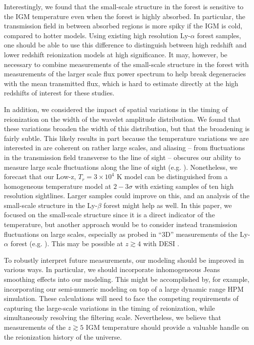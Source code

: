 Interestingly, we found that the small-scale structure in the
forest is sensitive to the IGM temperature even when the forest is highly absorbed. In particular, the transmission
field in between absorbed regions is more spiky if the IGM is cold, compared to hotter models. Using existing
high resolution Ly-$\alpha$ forest samples, one should be able to use this difference to 
distinguish between high redshift and lower
redshift reionization models at high significance. It may, however, be necessary to combine measurements
of the small-scale structure in the forest with measurements of the larger scale flux power spectrum to help
break degeneracies with the mean transmitted flux, which is hard to estimate directly at the high redshifts of
interest for these studies. 

In addition, we considered the impact of spatial variations in the timing of reionization on the width of
the wavelet amplitude distribution. We found that these variations broaden the width of this distribution, but
that the broadening is fairly subtle. This likely results in part because the temperature variations we
are interested in are coherent on rather large scales, and aliasing -- from fluctuations in the transmission
field transverse to the line of sight -- obscures our ability to measure large scale fluctuations along
the line of sight (e.g. \citealt{McQuinn:2010mq,Lai:2005ha}). Nonetheless, we forecast that our Low-z, $T_r=3 \times 10^4$
K model can be distinguished from a homogeneous temperature model at $2-3 \sigma$ with existing samples of ten high
resolution sightlines. Larger samples could improve on this, and an analysis of the small-scale structure in the
Ly-$\beta$ forest might help as well. In this paper, we focused on the small-scale structure since it is a direct
indicator of the temperature, but another approach would be to consider instead transmission fluctuations on
large scales, especially as probed in ``3D'' measurements of the Ly-$\alpha$ forest (e.g. \citealt{McQuinn:2010mq}). This
may be possible at $z \gtrsim 4$ with DESI \citep{Levi:2013gra,McQuinn:2010mq}.

To robustly interpret future measurements, our modeling should be improved in various ways. In particular, we should incorporate
inhomogeneous Jeans smoothing effects into our modeling. This might be accomplished by, for example, 
incorporating our semi-numeric
modeling on top of a large dynamic range HPM \citep{Gnedin:1997td} simulation. These 
calculations will need to face
the competing requirements of capturing the large-scale variations in the timing of reionization, while simultaneously
resolving the filtering scale. Nevertheless, we believe that measurements of the $z \gtrsim 5$ IGM temperature should
provide a valuable handle on the reionization history of the universe.


